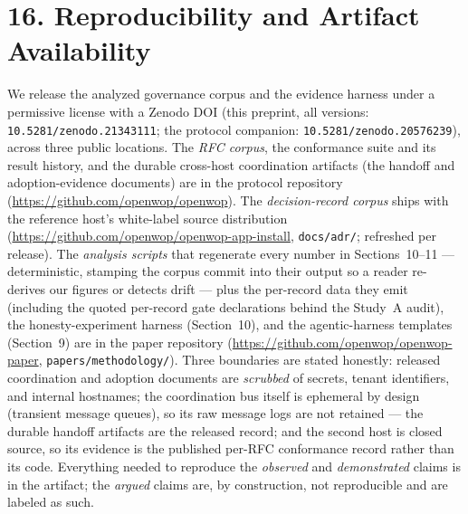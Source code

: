 \documentclass[11pt]{article}
\begin{document}
\section*{16. Reproducibility and Artifact Availability}
We release the analyzed governance corpus and the evidence harness under a permissive license with a
Zenodo DOI (this preprint, all versions: \texttt{10.5281/zenodo.21343111}; the protocol companion:
\texttt{10.5281/zenodo.20576239}), across three public locations. The \emph{RFC corpus}, the
conformance suite and its result history, and the durable cross-host coordination artifacts (the
handoff and adoption-evidence documents) are in the protocol repository
(\url{https://github.com/openwop/openwop}). The \emph{decision-record corpus} ships with the reference
host's white-label source distribution (\url{https://github.com/openwop/openwop-app-install},
\texttt{docs/adr/}; refreshed per release). The \emph{analysis scripts} that regenerate every number
in Sections~10--11 --- deterministic, stamping the corpus commit into their output so a reader
re-derives our figures or detects drift --- plus the per-record data they emit (including the quoted
per-record gate declarations behind the Study~A audit), the honesty-experiment harness (Section~10),
and the agentic-harness templates (Section~9) are in the paper repository
(\url{https://github.com/openwop/openwop-paper}, \texttt{papers/methodology/}). Three boundaries are
stated honestly: released coordination and adoption documents are \emph{scrubbed} of secrets, tenant
identifiers, and internal hostnames; the coordination bus itself is ephemeral by design (transient
message queues), so its raw message logs are not retained --- the durable handoff artifacts are the
released record; and the second host is closed source, so its evidence is the published per-RFC
conformance record rather than its code. Everything needed to reproduce the \emph{observed} and
\emph{demonstrated} claims is in the artifact; the \emph{argued} claims are, by construction, not
reproducible and are labeled as such.
\end{document}
